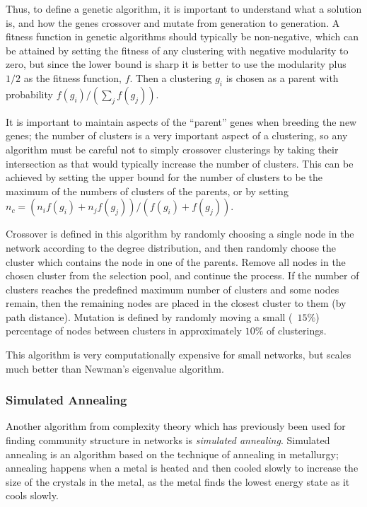 Thus, to define a genetic algorithm, it is important to understand what a solution is, and how the genes crossover and mutate from generation to generation.  A fitness function in genetic algorithms should typically be non-negative, which can be attained by setting the fitness of any clustering with negative modularity to zero, but since the lower bound is sharp it is better to use the modularity plus $1/2$ as the fitness function, $f$. Then a clustering $g_i$ is chosen as a parent with probability $f(g_i)/(\sum_j f(g_j))$.

It is important to maintain aspects of the ``parent'' genes when breeding the new genes; the number of clusters is a very important aspect of a clustering, so any algorithm must be careful not to simply crossover clusterings by taking their intersection as that would typically increase the number of clusters.  This can be achieved by setting the upper bound for the number of clusters to be the maximum of the numbers of clusters of the parents, or by setting $n_c = \left(n_i f(g_i)+n_j f(g_j)\right)/(f(g_i)+f(g_j))$.

Crossover is defined in this algorithm by randomly choosing a single node in the network according to the degree distribution, and then randomly choose the cluster which contains the node in one of the parents.  Remove all nodes in the chosen cluster from the selection pool, and continue the process.  If the number of clusters reaches the predefined maximum number of clusters and some nodes remain, then the remaining nodes are placed in the closest cluster to them (by path distance).  Mutation is defined by randomly moving a small (~$15\%$) percentage of nodes between clusters in approximately $10\%$ of clusterings.

This algorithm is very computationally expensive for small networks, but scales much better than Newman's eigenvalue algorithm.

\subsubsection{Simulated Annealing}

Another algorithm from complexity theory which has previously been used for finding community structure in networks is \emph{simulated annealing}.  Simulated annealing is an algorithm based on the technique of annealing in metallurgy; annealing happens when a metal is heated and then cooled slowly to increase the size of the crystals in the metal, as the metal finds the lowest energy state as it cools slowly.

